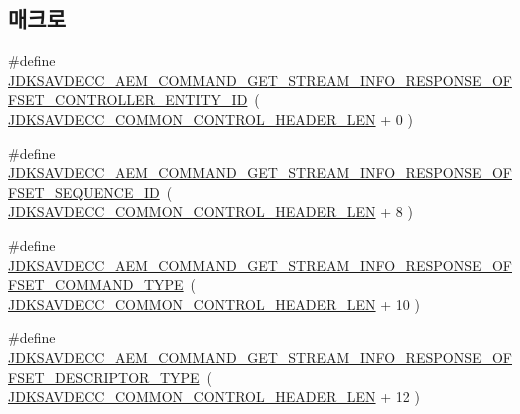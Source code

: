 \subsection*{매크로}
\begin{DoxyCompactItemize}
\item 
\#define \hyperlink{group__command__get__stream__info__response_ga22e81bf702362b882d0ca89a48cae90c}{J\+D\+K\+S\+A\+V\+D\+E\+C\+C\+\_\+\+A\+E\+M\+\_\+\+C\+O\+M\+M\+A\+N\+D\+\_\+\+G\+E\+T\+\_\+\+S\+T\+R\+E\+A\+M\+\_\+\+I\+N\+F\+O\+\_\+\+R\+E\+S\+P\+O\+N\+S\+E\+\_\+\+O\+F\+F\+S\+E\+T\+\_\+\+C\+O\+N\+T\+R\+O\+L\+L\+E\+R\+\_\+\+E\+N\+T\+I\+T\+Y\+\_\+\+ID}~( \hyperlink{group__jdksavdecc__avtp__common__control__header_gaae84052886fb1bb42f3bc5f85b741dff}{J\+D\+K\+S\+A\+V\+D\+E\+C\+C\+\_\+\+C\+O\+M\+M\+O\+N\+\_\+\+C\+O\+N\+T\+R\+O\+L\+\_\+\+H\+E\+A\+D\+E\+R\+\_\+\+L\+EN} + 0 )
\item 
\#define \hyperlink{group__command__get__stream__info__response_ga9060095a7a6fc82ae22727dbb9106178}{J\+D\+K\+S\+A\+V\+D\+E\+C\+C\+\_\+\+A\+E\+M\+\_\+\+C\+O\+M\+M\+A\+N\+D\+\_\+\+G\+E\+T\+\_\+\+S\+T\+R\+E\+A\+M\+\_\+\+I\+N\+F\+O\+\_\+\+R\+E\+S\+P\+O\+N\+S\+E\+\_\+\+O\+F\+F\+S\+E\+T\+\_\+\+S\+E\+Q\+U\+E\+N\+C\+E\+\_\+\+ID}~( \hyperlink{group__jdksavdecc__avtp__common__control__header_gaae84052886fb1bb42f3bc5f85b741dff}{J\+D\+K\+S\+A\+V\+D\+E\+C\+C\+\_\+\+C\+O\+M\+M\+O\+N\+\_\+\+C\+O\+N\+T\+R\+O\+L\+\_\+\+H\+E\+A\+D\+E\+R\+\_\+\+L\+EN} + 8 )
\item 
\#define \hyperlink{group__command__get__stream__info__response_ga70851257d987723560ec5e8386b29c6a}{J\+D\+K\+S\+A\+V\+D\+E\+C\+C\+\_\+\+A\+E\+M\+\_\+\+C\+O\+M\+M\+A\+N\+D\+\_\+\+G\+E\+T\+\_\+\+S\+T\+R\+E\+A\+M\+\_\+\+I\+N\+F\+O\+\_\+\+R\+E\+S\+P\+O\+N\+S\+E\+\_\+\+O\+F\+F\+S\+E\+T\+\_\+\+C\+O\+M\+M\+A\+N\+D\+\_\+\+T\+Y\+PE}~( \hyperlink{group__jdksavdecc__avtp__common__control__header_gaae84052886fb1bb42f3bc5f85b741dff}{J\+D\+K\+S\+A\+V\+D\+E\+C\+C\+\_\+\+C\+O\+M\+M\+O\+N\+\_\+\+C\+O\+N\+T\+R\+O\+L\+\_\+\+H\+E\+A\+D\+E\+R\+\_\+\+L\+EN} + 10 )
\item 
\#define \hyperlink{group__command__get__stream__info__response_gac8e85f7fc918060e917097152be4b3e4}{J\+D\+K\+S\+A\+V\+D\+E\+C\+C\+\_\+\+A\+E\+M\+\_\+\+C\+O\+M\+M\+A\+N\+D\+\_\+\+G\+E\+T\+\_\+\+S\+T\+R\+E\+A\+M\+\_\+\+I\+N\+F\+O\+\_\+\+R\+E\+S\+P\+O\+N\+S\+E\+\_\+\+O\+F\+F\+S\+E\+T\+\_\+\+D\+E\+S\+C\+R\+I\+P\+T\+O\+R\+\_\+\+T\+Y\+PE}~( \hyperlink{group__jdksavdecc__avtp__common__control__header_gaae84052886fb1bb42f3bc5f85b741dff}{J\+D\+K\+S\+A\+V\+D\+E\+C\+C\+\_\+\+C\+O\+M\+M\+O\+N\+\_\+\+C\+O\+N\+T\+R\+O\+L\+\_\+\+H\+E\+A\+D\+E\+R\+\_\+\+L\+EN} + 12 )

\end{DoxyCompactItemize}
